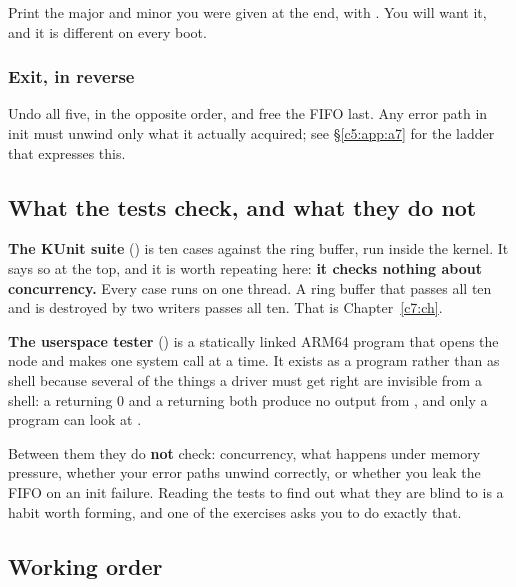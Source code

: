 Print the major and minor you were given at the end, with . You will want it, and it
is different on every boot.

\subsubsection{Exit, in reverse}
\label{c5:app:b:exit-in-reverse}

Undo all five, in the opposite order, and free the FIFO last. Any error path in init must unwind
only what it actually acquired; see \S\ref{c5:app:a7} for the  ladder that expresses
this.

\subsection{What the tests check, and what they do not}
\label{c5:app:b3}

\textbf{The KUnit suite} () is ten cases against the ring
buffer, run inside the kernel. It says so at the top, and it is worth repeating here: \textbf{it
checks nothing about concurrency.} Every case runs on one thread. A ring buffer that passes all ten
and is destroyed by two writers passes all ten. That is Chapter~\ref{c7:ch}.

\textbf{The userspace tester} () is a statically linked
ARM64 program that opens the node and makes one system call at a time. It exists as a program rather
than as shell because several of the things a driver must get right are invisible from a shell: a
 returning 0 and a  returning  both produce no output from
, and only a program can look at .

Between them they do \textbf{not} check: concurrency, what happens under memory pressure, whether
your error paths unwind correctly, or whether you leak the FIFO on an init failure. Reading the
tests to find out what they are blind to is a habit worth forming, and one of the exercises asks you
to do exactly that.

\subsection{Working order}
\label{c5:app:b4}

